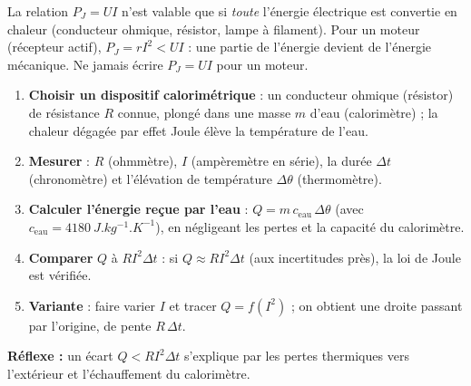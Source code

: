 \documentclass[11pt]{article}
\begin{document}
\begin{attention}
La relation $P_J = U I$ n'est valable que si \emph{toute} l'énergie électrique est convertie en chaleur (conducteur ohmique, résistor, lampe à filament). Pour un moteur (récepteur actif), $P_J = r I^2 < U I$ : une partie de l'énergie devient de l'énergie mécanique. Ne jamais écrire $P_J = UI$ pour un moteur.
\end{attention}

\begin{methode}[Protocole de vérification de $W_J = R I^2 \Delta t$]
\begin{enumerate}
\item \textbf{Choisir un dispositif calorimétrique} : un conducteur ohmique (résistor) de résistance $R$ connue, plongé dans une masse $m$ d'eau (calorimètre) ; la chaleur dégagée par effet Joule élève la température de l'eau.
\item \textbf{Mesurer} : $R$ (ohmmètre), $I$ (ampèremètre en série), la durée $\Delta t$ (chronomètre) et l'élévation de température $\Delta\theta$ (thermomètre).
\item \textbf{Calculer l'énergie reçue par l'eau} : $Q = m\,c_{\text{eau}}\,\Delta\theta$ (avec $c_{\text{eau}} = \SI{4180}{J.kg^{-1}.K^{-1}}$), en négligeant les pertes et la capacité du calorimètre.
\item \textbf{Comparer} $Q$ à $R I^2 \Delta t$ : si $Q \approx R I^2 \Delta t$ (aux incertitudes près), la loi de Joule est vérifiée.
\item \textbf{Variante} : faire varier $I$ et tracer $Q = f(I^2)$ ; on obtient une droite passant par l'origine, de pente $R\,\Delta t$.
\end{enumerate}
\textbf{Réflexe :} un écart $Q < R I^2 \Delta t$ s'explique par les pertes thermiques vers l'extérieur et l'échauffement du calorimètre.
\end{methode}
\end{document}

